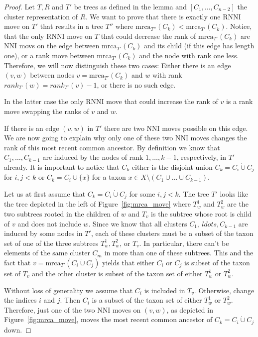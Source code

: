 \documentclass{amsart}
\newcommand{\mrca}{\mathrm{mrca}}
\newcommand{\nni}{\mathrm{NNI}}
\newcommand{\rnni}{\mathrm{RNNI}}
\begin{document}
\begin{proof}
Let $T, R$ and $T'$ be trees as defined in the lemma and $[C_1, \ldots, C_{n-2}]$ the cluster representation of $R$.
We want to prove that there is exactly one $\rnni$ move on $T'$ that results in a tree $T''$ where $\mrca_{T''}(C_k) < \mrca_{T'}(C_k)$.
Notice, that the only $\rnni$ move on $T$ that could decrease the rank of $\mrca_{T'}(C_k)$ are $\nni$ movs on the edge between $\mrca_{T'}(C_k)$ and its child (if this edge has length one), or a rank move between $\mrca_{T'}(C_k)$ and the node with rank one less.
Therefore, we will now distinguish these two cases:
Either there is an edge $(v,w)$ between nodes $v = \mrca_{T'}(C_k)$ and $w$ with rank $rank_{T'}(w) = rank_{T'}(v) - 1$, or there is no such edge.

In the latter case the only $\rnni$ move that could increase the rank of $v$ is a rank move swapping the ranks of $v$ and $w$.

If there is an edge $(v,w)$ in $T'$ there are two $\nni$ moves possible on this edge.
We are now going to explain why only one of these two $\nni$ moves changes the rank of this most recent common ancestor.
By definition we know that $C_1, \ldots, C_{k-1}$ are induced by the nodes of rank $1, \ldots, k-1$, respectively, in $T'$ already.
It is important to notice that $C_k$ either is the disjoint union $C_k = C_i \dot\cup C_j$ for $i,j < k$ or $C_k = C_i \dot\cup \{x\}$ for a taxon $x \in X \setminus (C_1 \cup \ldots \cup C_{k-1})$.

Let us at first assume that $C_k = C_i \dot\cup C_j$ for some $i,j < k$.
The tree $T'$ looks like the tree depicted in the left of Figure~\ref{fig:mrca_move} where $T_w^1$ and $T_w^2$ are the two subtrees rooted in the children of $w$ and $T_v$ is the subtree whose root is child of $v$ and does not include $w$.
Since we know that all clusters $C_1,\ ldots, C_{k-1}$ are induced by some nodes in $T'$, each of these clusters must be a subset of the taxon set of one of the three subtrees $T_w^1,T_w^2$, or $T_v$.
In particular, there can't be elements of the same cluster $C_m$ in more than one of these subtrees.
This and the fact that $v = \mrca_{T'}(C_i \dot\cup C_j)$ yields that either $C_i$ or $C_j$ is subset of the taxon set of $T_v$ and the other cluster is subset of the taxon set of either $T_w^1$ or $T_w^2$.

Without loss of generality we assume that $C_i$ is included in $T_v$.
Otherwise, change the indices $i$ and $j$.
Then $C_i$ is a subset of the taxon set of either $T_w^1$ or $T_w^2$.
Therefore, just one of the two $\nni$ moves on $(v,w)$, as depicted in Figure~\ref{fig:mrca_move}, moves the most recent common ancestor of $C_k = C_i \dot \cup C_j$ down.


\end{proof}
\end{document}
